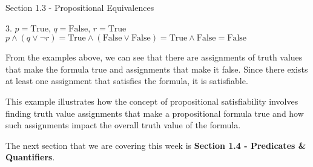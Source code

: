 \begin{notes}{Section 1.3 - Propositional Equivalences}
\begin{highlight}
        3. \(p = \text{True}\), \(q = \text{False}\), \(r = \text{True}\)
        \(p \land (q \lor \neg r) = \text{True} \land (\text{False} \lor \text{False}) = \text{True} \land \text{False} = \text{False}\)

    
        From the examples above, we can see that there are assignments of truth values that make the formula true and assignments that make it false. Since there exists at least one assignment that satisfies the formula, it is satisfiable.
    
        This example illustrates how the concept of propositional satisfiability involves finding truth value assignments that make a propositional formula true and how such assignments impact the overall truth value of the formula.
    \end{highlight}
\end{notes}

The next section that we are covering this week is \textbf{Section 1.4 - Predicates \& Quantifiers}.

